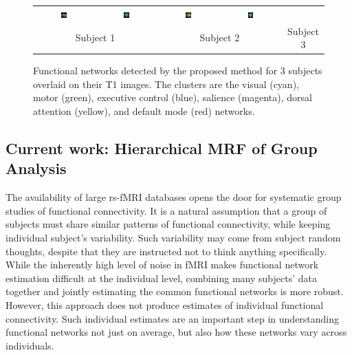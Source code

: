 \documentclass[12pt]{article}
\begin{document}
\begin{figure}[htb]
\begin{center}
\begin{tabular}{cccccc}
      \includegraphics[width=0.1\textwidth]{figures/wholebrain/sub2/saggital0029} &
      \includegraphics[width=0.1\textwidth]{figures/wholebrain/sub2/coronal0029} &
      \includegraphics[width=0.1\textwidth]{figures/wholebrain/sub5/saggital0029} &
      \includegraphics[width=0.1\textwidth]{figures/wholebrain/sub5/coronal0029}\\

      \multicolumn{2}{c}{\small Subject 1} &
      \multicolumn{2}{c}{\small Subject 2} &
      \multicolumn{2}{c}{\small Subject 3}
    \end{tabular}
  \end{center}
  \caption {Functional networks detected by the proposed method for 3 subjects
    overlaid on their T1 images.  The clusters are the visual (cyan), motor
    (green), executive control (blue), salience (magenta), dorsal attention
    (yellow), and default mode (red) networks.}
  \label{fig:wholebrain}
\end{figure}

\subsection{Current work: Hierarchical MRF of Group Analysis} \label{sec:hier}

The availability of large rs-fMRI databases opens the door for systematic group
studies of functional connectivity. It is a natural assumption that a group of
subjects must share similar patterns of functional connectivity, while keeping
individual subject's variability. Such variability may come from subject random
thoughts, despite that they are instructed not to think anything
specifically. While the inherently high level of noise in fMRI makes functional
network estimation difficult at the individual level, combining many subjects'
data together and jointly estimating the common functional networks is more
robust. However, this approach does not produce estimates of individual
functional connectivity. Such individual estimates are an important step in
understanding functional networks not just on average, but also how these
networks vary across individuals.
\end{document}

